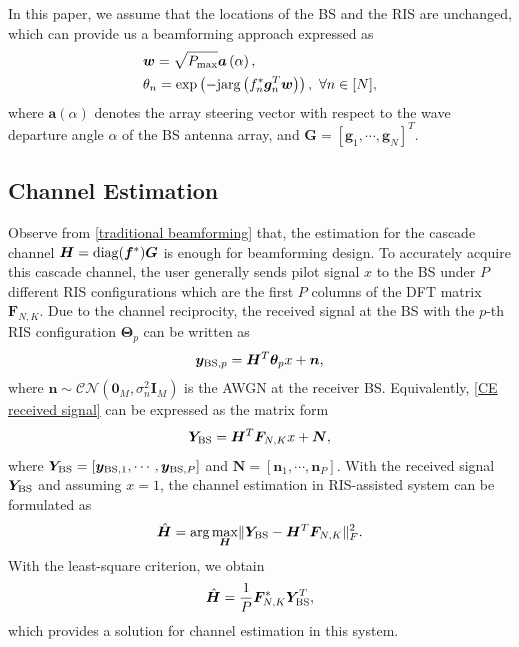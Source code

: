 \documentclass[12pt,draftclsnofoot,journal,onecolumn]{IEEEtran}
\theoremstyle{nonumberplain}
\def \exp {\text{exp}}
\def \arg {\text{arg}}
\begin{document}
        
        In this paper, we assume that the locations of the \ac{BS} and the RIS are unchanged, which can provide us a beamforming approach expressed as
                \begin{subequations}
\label{traditional beamforming}
\begin{align}
\label{w_optimal}
&\bm w=\sqrt{P_{\rm max}}\bm a\left(\alpha\right),\\
\label{theta_optimal}
&\theta_{n} = \exp\left(-{\rm j} \arg\left(f_{n}^{*}\bm g_{n}^{T}\bm w\right)\right),~\forall n\in [N],
\end{align}
\end{subequations}
where $\bm a(\alpha)$ denotes the array steering vector with respect to the wave departure angle $\alpha$ of the BS antenna array, and $\bm G = \left[\bm g_{1}, \cdots, \bm g_{N}\right]^{T}$.

\subsection{Channel Estimation}
\label{Channel Estimation}
Observe from \eqref{traditional beamforming} that, the estimation for the cascade channel ${\bm H} = {\rm diag}({\bm f}^{*})\bm G$ is enough for beamforming design.
To accurately acquire this cascade channel, the user generally sends pilot signal $x$ to the BS under $P$ different RIS configurations which are the first $P$ columns of the DFT matrix $\bm F_{N,K}$. Due to the channel reciprocity, the received signal at the BS with the $p$-th RIS configuration $\bm \Theta_{p}$ can be written as \cite{atapattu2020reconfigurable}
    \begin{equation}
    \label{CE received signal}
            {\bm y}_{{\rm BS}, p} =\bm H^{T} {\bm \theta}_p x+\bm n,
    \end{equation}
    where $\bm n\sim \mathcal{CN}\left( \bm 0_{M}, \sigma_{n}^{2}\bm I_{M}\right)$ is the \ac{AWGN} at the receiver BS.
Equivalently, \eqref{CE received signal} can be expressed as the matrix form
    \begin{equation}
    \label{eqn:MMSE_CE}
        {\bm Y}_{\rm BS}=\bm H^{T} \bm F_{N,K}x + {\bm N},
    \end{equation}
    where ${\bm Y}_{\rm BS}=\left[\bm y_{{\rm BS}, 1},\cdots,\bm y_{{\rm BS}, P}\right]$ and $\bm N = \left[ \bm n_{1},\cdots,\bm n_{P}\right]$.
With the received signal $\bm Y_{\rm BS}$ and assuming $x=1$, the channel estimation in RIS-assisted system can be formulated as 
    \begin{equation}
        \hat{\bm H} = \arg\max_{\bm H} \lVert {\bm Y}_{\rm BS} - {\bm H^{T}} {\bm F}_{N,K}\rVert_{F}^2.
    \end{equation}
    With the least-square criterion, we obtain
    \begin{equation}
        \hat{\bm H} = \frac{1}{P}{\bm F}_{N,K}^{*}{\bm Y}_{\rm BS}^{T},
        \label{eqn:MMSE-CE}
    \end{equation}
    which provides a solution for channel estimation in this system.
\end{document}
